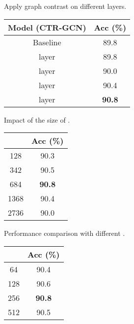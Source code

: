 \documentclass{article} \usepackage{iclr2023_conference,times}
\begin{document}
\begin{minipage}{\textwidth}
\begin{minipage}[t]{0.3\textwidth}
\centering
\setlength\tabcolsep{2pt}
\makeatletter{}
\setlength\tabcolsep{2.5pt}
   \scriptsize
   \caption{Apply graph contrast on different layers.}
    \begin{tabular}{c||c}
       \rowcolor{gray!30} Model (CTR-GCN) & Acc (\%) \\
       \hline \hline
       Baseline & 89.8 \\\hline
        layer & 89.8 \\
        layer & 90.0 \\
        layer & 90.4 \\
        layer & \textbf{90.8} \\
       \hline
    \end{tabular}
    \label{table:different layer to contrast}
\end{minipage}
\hspace{3mm}
\begin{minipage}[t]{0.3\textwidth}
\centering
\makeatletter{}
\setlength\tabcolsep{2.5pt}
\scriptsize
\caption{Impact of the size of .}
    \begin{tabular}{c||c}
\rowcolor{gray!30}  & Acc (\%) \\
       \hline \hline
        128 & 90.3 \\
        342 & 90.5 \\
        684 & \textbf{90.8} \\
        1368 & 90.4 \\
        2736 & 90.0 \\\hline
    \end{tabular}
    \label{tab: capacity of instance memory bank.}
\end{minipage}
\hspace{3mm}
\begin{minipage}[t]{0.3\textwidth}
\centering
\makeatletter{}
\setlength\tabcolsep{2.5pt}
   \scriptsize
   \caption{Performance comparison with different .}
    \begin{tabular}{c||c}
\rowcolor{gray!30}  & Acc (\%) \\
       \hline \hline
        64 &	90.4 \\
        128 &	90.6 \\
        256 &	\textbf{90.8} \\ 
        512 &	90.5 \\\hline
    \end{tabular}
    \label{tab:C_g.}
\end{minipage}


\end{minipage}
\end{document}
